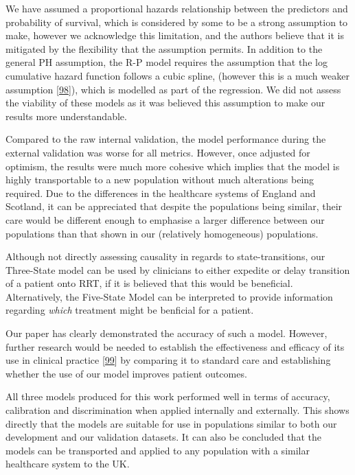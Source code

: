 \documentclass[12pt,PhD,twoside,openright]{muthesis}
\begin{document}
We have assumed a proportional hazards relationship between the predictors and probability of survival, which is considered by some to be a strong assumption to make, however we acknowledge this limitation, and the authors believe that it is mitigated by the flexibility that the assumption permits. In addition to the general PH assumption, the R-P model requires the assumption that the log cumulative hazard function follows a cubic spline, (however this is a much weaker assumption {[}\protect\hyperlink{ref-royston_flexible_2002}{98}{]}), which is modelled as part of the regression. We did not assess the viability of these models as it was believed this assumption to make our results more understandable.

Compared to the raw internal validation, the model performance during the external validation was worse for all metrics. However, once adjusted for optimism, the results were much more cohesive which implies that the model is highly transportable to a new population without much alterations being required. Due to the differences in the healthcare systems of England and Scotland, it can be appreciated that despite the populations being similar, their care would be different enough to emphasise a larger difference between our populations than that shown in our (relatively homogeneous) populations.

Although not directly assessing causality in regards to state-transitions, our Three-State model can be used by clinicians to either expedite or delay transition of a patient onto RRT, if it is believed that this would be beneficial. Alternatively, the Five-State Model can be interpreted to provide information regarding \emph{which} treatment might be benficial for a patient.

Our paper has clearly demonstrated the accuracy of such a model. However, further research would be needed to establish the effectiveness and efficacy of its use in clinical practice {[}\protect\hyperlink{ref-moons_prognosis_2009-1}{99}{]} by comparing it to standard care and establishing whether the use of our model improves patient outcomes.

All three models produced for this work performed well in terms of accuracy, calibration and discrimination when applied internally and externally. This shows directly that the models are suitable for use in populations similar to both our development and our validation datasets. It can also be concluded that the models can be transported and applied to any population with a similar healthcare system to the UK.
\end{document}
